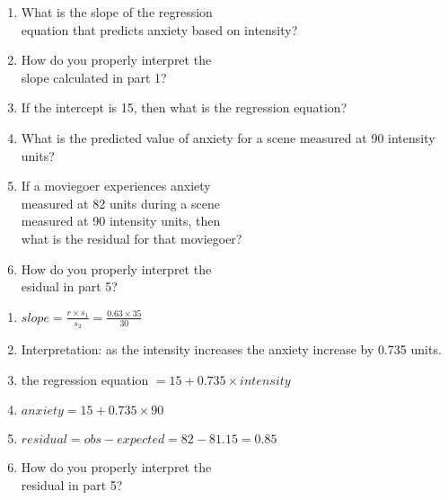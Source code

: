\documentclass[11pt]{book}\usepackage[]{graphicx}\usepackage[]{color}
\begin{document}
\begin{exercises}
\begin{exercise}
\begin{enumerate}
  \item What is the slope of the regression \\ equation that predicts anxiety based on intensity?
  \item	How do you properly interpret the \\ slope calculated in part 1?
  \item	If the intercept is 15, then what is the regression equation?
  \item	What is the predicted value of anxiety for a scene measured at 90 intensity \\ units?
  \item	If a moviegoer experiences anxiety \\ measured at 82 units during a scene \\ measured at 90 intensity units, then     \\what is the residual for that moviegoer?
  \item	How do you properly interpret the \\ esidual in part 5?
\end{enumerate}

\end{exercise}
\begin{solution}

   \begin{enumerate}
  \item $slope = \frac{ r \times s_1}{s_2} = \frac{0.63 \times 35}{30}$
  \item	Interpretation: as the intensity increases the anxiety increase by 0.735 units. 
  \item	the regression equation $ = 15 + 0.735 \times intensity$ 
  \item	 $anxiety = 15 + 0.735 \times 90 $
  \item	$ residual = obs - expected = 82 - 81.15 = 0.85$ 
  \item	How do you properly interpret the \\ residual in part 5?
\end{enumerate}

\end{solution}


 \begin{exercise} %


\end{exercise}
\end{exercises}
\end{document}
